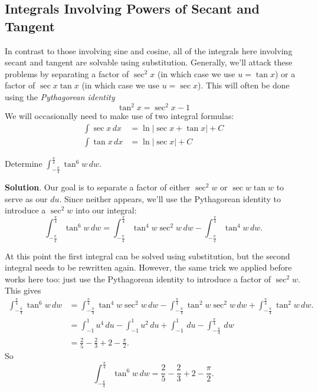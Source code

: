 \documentclass[10pt,]{book}
\theoremstyle{ptxplainnotitle}
\theoremstyle{ptxplaintitle}
\theoremstyle{ptxplainnotitle}
\theoremstyle{ptxplaintitle}
\theoremstyle{ptxplainnotitle}
\theoremstyle{ptxplaintitle}
\theoremstyle{ptxdefinitionnotitle}
\theoremstyle{ptxdefinitiontitle}
\theoremstyle{ptxdefinitionnotitle}
\theoremstyle{ptxdefinitiontitle}
\theoremstyle{ptxdefinitionnotitle}
\theoremstyle{ptxdefinitiontitle}
\theoremstyle{ptxdefinitionnotitle}
\theoremstyle{ptxdefinitiontitle}
\theoremstyle{ptxdefinitionnotitle}
\theoremstyle{ptxdefinitiontitle}
\numberwithin{equation}{section}
\begin{document}
\subsection[{Integrals Involving Powers of Secant and Tangent}]{Integrals Involving Powers of Secant and Tangent}\label{subsection-integrals-involving-powers-of-secant-and-tangent}
\hypertarget{p-531}{}%
In contrast to those involving sine and cosine, all of the integrals here involving secant and tangent are solvable using substitution. Generally, we'll attack these problems by separating a factor of \(\sec^{2}x\) (in which case we use \(u = \tan x\)) or a factor of \(\sec x\tan x\) (in which case we use \(u = \sec x\)). This will often be done using the \emph{Pythagorean identity}%
\begin{equation*}
\tan^{2}x = \sec^{2}x - 1 
\end{equation*}
We will occasionally need to make use of two integral formulas:%
\begin{align*}
\int\sec x\,dx & = \ln|\sec x + \tan x| + C \\
\int\tan x\,dx & = \ln|\sec x| + C 
\end{align*}
%
\begin{example}\label{example-integrating-a-power-of-tangent}
\hypertarget{p-532}{}%
Determine \(\int_{-\frac{\pi}{4}}^{\frac{\pi}{4}}\tan^{6}w\,dw\).%
\par\smallskip%
\noindent\textbf{Solution}.\hypertarget{solution-117}{}\quad%
\hypertarget{p-533}{}%
Our goal is to separate a factor of either \(\sec^{2}w\) or \(\sec w\tan w\) to serve as our \(du\). Since neither appears, we'll use the Pythagorean identity to introduce a \(\sec^{2}w\) into our integral:%
\begin{equation*}
\int_{-\frac{\pi}{4}}^{\frac{\pi}{4}}\tan^{6}w\,dw = \int_{-\frac{\pi}{4}}^{\frac{\pi}{4}}\tan^{4}w\sec^{2}w\,dw - \int_{-\frac{\pi}{4}}^{\frac{\pi}{4}}\tan^{4}w\,dw.
\end{equation*}
%
\par
\hypertarget{p-534}{}%
At this point the first integral can be solved using substitution, but the second integral needs to be rewritten again. However, the same trick we applied before works here too: just use the Pythagorean identity to introduce a factor of \(\sec^{2}w\). This gives%
\begin{align*}
\int_{-\frac{\pi}{4}}^{\frac{\pi}{4}}\tan^{6}w\,dw & = \int_{-\frac{\pi}{4}}^{\frac{\pi}{4}}\tan^{4}w\sec^{2}w\,dw - \int_{-\frac{\pi}{4}}^{\frac{\pi}{4}}\tan^{2}w\sec^{2}w\,dw + \int_{-\frac{\pi}{4}}^{\frac{\pi}{4}}\tan^{2}w\,dw.\\
& = \int_{-1}^{1}u^{4}\,du - \int_{-1}^{1}u^{2}\,du + \int_{-1}^{1}\,du - \int_{-\frac{\pi}{4}}^{\frac{\pi}{4}}\,dw \\
& = \frac{2}{5} - \frac{2}{3} + 2 - \frac{\pi}{2}. 
\end{align*}
So%
\begin{equation*}
\int_{-\frac{\pi}{4}}^{\frac{\pi}{4}}\tan^{6}w\,dw = \frac{2}{5} - \frac{2}{3} + 2 - \frac{\pi}{2}.
\end{equation*}
%
\end{example}
\end{document}
